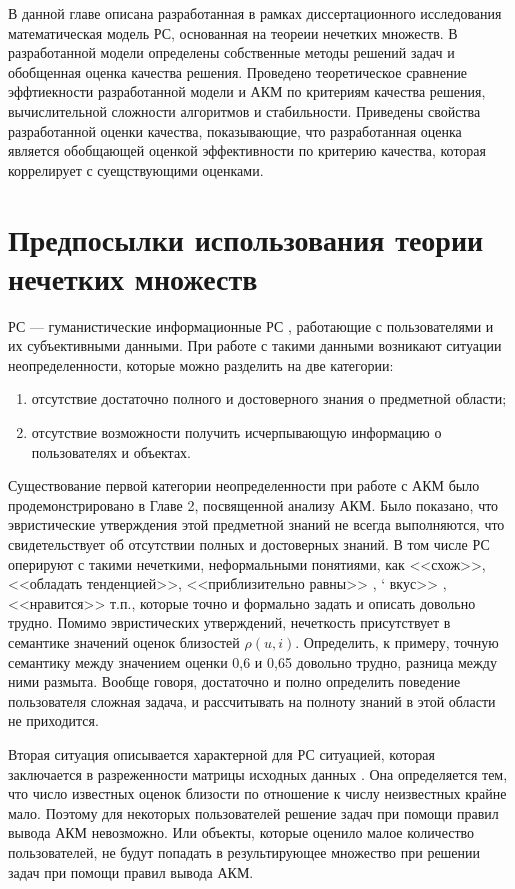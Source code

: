В данной главе описана разработанная в рамках диссертационного исследования
математическая модель РС, основанная на теореии нечетких множеств.
В разработанной модели определены собственные методы решений задач и
обобщенная оценка качества решения.
Проведено теоретическое сравнение эффтиекности разработанной модели
и АКМ по критериям качества решения, вычислительной сложности алгоритмов и
стабильности.
Приведены свойства
разработанной оценки качества, показывающие, что разработанная оценка является
обобщающей оценкой эффективности по критерию качества, которая коррелирует с
суещствующими оценками.

\section{Предпосылки использования теории нечетких множеств}
РС --- гуманистические информационные РС \cite{fuzzy-ponomarev},
работающие с пользователями и их субъективными данными.
При работе с такими данными возникают ситуации неопределенности,
которые можно разделить на две категории:
\begin{enumerate}
\item отсутствие достаточно полного и достоверного знания о предметной области;
\item отсутствие возможности получить исчерпывающую информацию о пользователях
	и объектах.
\end{enumerate}

Существование первой категории неопределенности при работе с АКМ было
продемонстрировано в Главе 2, посвященной анализу АКМ. Было показано, что
эвристические утверждения этой предметной знаний не всегда выполняются, что
свидетельствует об отсутствии полных и достоверных знаний.
В том числе РС оперируют с такими нечеткими, неформальными понятиями, как
<<схож>>, <<обладать тенденцией>>, <<приблизительно равны>> , \lq
вкус>> , <<нравится>> т.п.,
которые точно и формально задать и описать довольно трудно.
Помимо эвристических утверждений, нечеткость присутствует в семантике значений
оценок близостей $\rho(u, i)$. Определить, к примеру, точную семантику между
значением оценки 0,6 и 0,65 довольно трудно, разница между ними размыта.
Вообще говоря, достаточно и полно определить поведение пользователя сложная задача, и
рассчитывать на полноту знаний в этой области не приходится.

Вторая ситуация описывается характерной для РС ситуацией,
которая заключается в разреженности матрицы исходных данных \cite{sparse1, sparse2, sparse3}.
Она определяется тем, что число известных оценок близости по отношение
к числу неизвестных крайне мало. Поэтому для некоторых пользователей
решение задач при помощи правил вывода АКМ невозможно. Или объекты, которые
оценило малое количество пользователей, не будут попадать в результирующее
множество при решении задач при помощи правил вывода АКМ.


